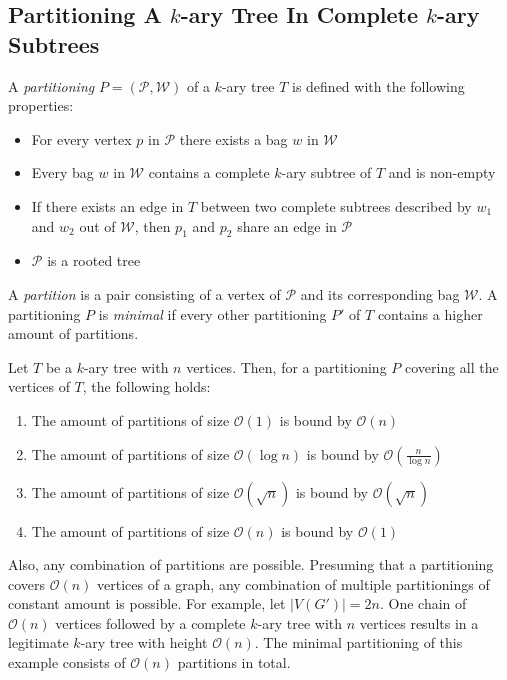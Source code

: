 \subsection{Partitioning A $k$-ary Tree In Complete $k$-ary Subtrees}
\begin{definition}
	A \emph{partitioning} $P = (\mathcal{P},\mathcal{W})$ of a $k$-ary tree $T$ is defined with the following properties:
	\begin{itemize}
		\item For every vertex $p$ in $\mathcal{P}$ there exists a bag $w$ in $\mathcal{W}$
		\item Every bag $w$ in $\mathcal{W}$ contains a complete $k$-ary subtree of $T$ and is non-empty
		\item If there exists an edge in $T$ between two complete subtrees described by $w_1$ and $w_2$ out of $\mathcal{W}$, then $p_1$ and $p_2$ share an edge in $\mathcal{P}$
		\item $\mathcal{P}$ is a rooted tree		
	\end{itemize}
	A \emph{partition} is a pair consisting of a vertex of $\mathcal{P}$ and its corresponding bag $\mathcal{W}$. A partitioning $P$ is \emph{minimal} if every other partitioning $P'$ of $T$ contains a higher amount of partitions.
\end{definition}
Let $T$ be a $k$-ary tree with $n$ vertices. Then, for a partitioning $P$ covering all the vertices of $T$, the following holds:
\begin{enumerate}
	\item The amount of partitions of size $\mathcal{O}(1)$ is bound by $\mathcal{O}(n)$
	\item The amount of partitions of size $\mathcal{O}(\log n)$ is bound by $\mathcal{O}\left(\frac{n}{\log n}\right)$
	\item The amount of partitions of size $\mathcal{O}(\sqrt{n})$ is bound by $\mathcal{O}(\sqrt{n})$
	\item The amount of partitions of size $\mathcal{O}(n)$ is bound by $\mathcal{O}(1)$
\end{enumerate}
Also, any combination of partitions are possible. Presuming that a partitioning covers $\mathcal{O}(n)$ vertices of a graph, any combination of multiple partitionings of constant amount is possible. For example, let $|V(G')| = 2n$. One chain of $\mathcal{O}(n)$ vertices followed by a complete $k$-ary tree with $n$ vertices results in a legitimate $k$-ary tree with height $\mathcal{O}(n)$. The minimal partitioning of this example consists of $\mathcal{O}(n)$ partitions in total.
